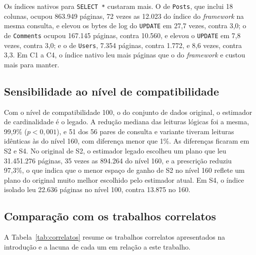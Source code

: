 Os índices nativos para \texttt{SELECT *} custaram mais. O de \texttt{Posts}, que inclui 18 colunas, ocupou 863.949 páginas, 72 vezes as 12.023 do índice do \textit{framework} na mesma consulta, e elevou os bytes de log do \texttt{UPDATE} em 27,7 vezes, contra 3,0; o de \texttt{Comments} ocupou 167.145 páginas, contra 10.560, e elevou o \texttt{UPDATE} em 7,8 vezes, contra 3,0; e o de \texttt{Users}, 7.354 páginas, contra 1.772, e 8,6 vezes, contra 3,3. Em C1 a C4, o índice nativo leu mais páginas que o do \textit{framework} e custou mais para manter.

\subsection{Sensibilidade ao nível de compatibilidade}\label{sec:sensibilidade}

Com o nível de compatibilidade 100, o do conjunto de dados original, o estimador de cardinalidade é o legado. A redução mediana das leituras lógicas foi a mesma, 99,9\% ($p < 0{,}001$), e 51 dos 56 pares de consulta e variante tiveram leituras idênticas às do nível 160, com diferença menor que 1\%. As diferenças ficaram em S2 e S4. No original de S2, o estimador legado escolheu um plano que leu 31.451.276 páginas, 35 vezes as 894.264 do nível 160, e a prescrição reduziu 97,3\%, o que indica que o menor espaço de ganho de S2 no nível 160 reflete um plano do original muito melhor escolhido pelo estimador atual. Em S4, o índice isolado leu 22.636 páginas no nível 100, contra 13.875 no 160.

\subsection{Comparação com os trabalhos correlatos}\label{sec:comparacao}

A Tabela~\ref{tab:correlatos} resume os trabalhos correlatos apresentados na introdução e a lacuna de cada um em relação a este trabalho.

